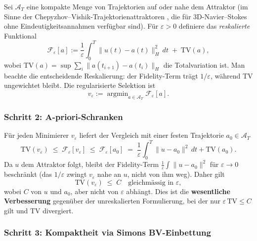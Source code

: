 \documentclass[12pt,a4paper]{article}
\theoremstyle{definition}
\theoremstyle{plain}
\theoremstyle{remark}
\begin{document}
Sei $\mathcal{A}_T$ eine kompakte Menge von Trajektorien auf oder nahe dem Attraktor (im Sinne der Chepyzhov--Vishik-Trajektorienattraktoren \cite{ChepyzhovVishik2002}, die f\"ur 3D-Navier--Stokes ohne Eindeutigkeitsannahmen verf\"ugbar sind). F\"ur $\varepsilon > 0$ definiere das \emph{reskalierte} Funktional
\begin{equation}\label{eq:trajectory-functional}
  \mathcal{F}_\varepsilon[a] := \frac{1}{\varepsilon}\int_0^T \|u(t) - a(t)\|_H^2 \, dt \;+\; \mathrm{TV}(a),
\end{equation}
wobei $\mathrm{TV}(a) = \sup \sum_{i} \|a(t_{i+1}) - a(t_i)\|_H$ die Totalvariation ist. Man beachte die entscheidende Reskalierung: der Fidelity-Term tr\"agt $1/\varepsilon$, w\"ahrend TV ungewichtet bleibt. Die regularisierte Selektion ist
\begin{equation}\label{eq:reg-selection}
  v_\varepsilon := \operatorname{argmin}_{a \in \mathcal{A}_T} \mathcal{F}_\varepsilon[a].
\end{equation}

\subsubsection*{Schritt 2: A-priori-Schranken}

F\"ur jeden Minimierer $v_\varepsilon$ liefert der Vergleich mit einer festen Trajektorie $a_0 \in \mathcal{A}_T$
\begin{equation}\label{eq:apriori}
  \mathrm{TV}(v_\varepsilon) \;\leq\; \mathcal{F}_\varepsilon[v_\varepsilon] \;\leq\; \mathcal{F}_\varepsilon[a_0] \;=\; \frac{1}{\varepsilon}\int_0^T \|u - a_0\|^2\,dt + \mathrm{TV}(a_0).
\end{equation}
Da $u$ dem Attraktor folgt, bleibt der Fidelity-Term $\frac{1}{\varepsilon}\int\|u-a_0\|^2$ f\"ur $\varepsilon \to 0$ beschr\"ankt (das $1/\varepsilon$ zwingt $v_\varepsilon$ nahe an $u$, nicht von ihm weg). Daher gilt
\begin{equation}\label{eq:tv-bound}
  \mathrm{TV}(v_\varepsilon) \;\leq\; C \quad \text{gleichm\"assig in } \varepsilon,
\end{equation}
wobei $C$ von $u$ und $a_0$, aber nicht von $\varepsilon$ abh\"angt. Dies ist die \textbf{wesentliche Verbesserung} gegen\"uber der unreskalierten Formulierung, bei der nur $\varepsilon\,\mathrm{TV} \leq C$ gilt und TV divergiert.

\subsubsection*{Schritt 3: Kompaktheit via Simons BV-Einbettung}
\end{document}
